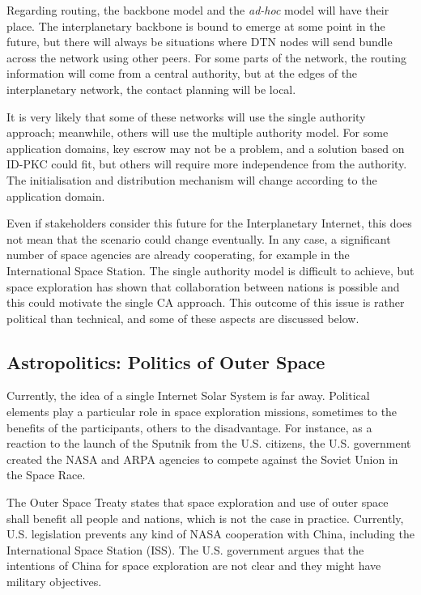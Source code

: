 Regarding routing, the backbone model and the \textit{ad-hoc} model will have their place. The interplanetary backbone is bound to emerge at some point in the future, but there will always be situations where DTN nodes will send bundle across the network using other peers. For some parts of the network, the routing information will come from a central authority, but at the edges of the interplanetary network, the contact planning will be local. 

It is very likely that some of these networks will use the single authority approach; meanwhile, others will use the multiple authority model. For some application domains, key escrow may not be a problem, and a solution based on ID-PKC could fit, but others will require more independence from the authority. The initialisation and distribution mechanism will change according to the application domain.


Even if stakeholders consider this future for the Interplanetary Internet, this does not mean that the scenario could change eventually. In any case, a significant number of space agencies are already cooperating, for example in the International Space Station.  The single authority model is difficult to achieve, but space exploration has shown that collaboration between nations is possible and this could motivate the single CA approach. This outcome of this issue is rather political than technical, and some of these aspects are discussed below. 


\subsection{Astropolitics: Politics of Outer Space}

Currently, the idea of a single Internet Solar System is far away. Political elements play a particular role in space exploration missions, sometimes to the benefits of the participants, others to the disadvantage. For instance, as a reaction to the launch of the Sputnik from the U.S. citizens, the U.S. government created the NASA and ARPA agencies to compete against the Soviet Union in the Space Race.



The Outer Space Treaty \cite{ireland1967treaty} states that space exploration and use of outer space shall benefit all people and nations, which is not the case in practice. Currently, U.S. legislation prevents any kind of NASA cooperation with China, including the International Space Station (ISS). The U.S. government argues that the intentions of China for space exploration are not clear and they might have military objectives. 

